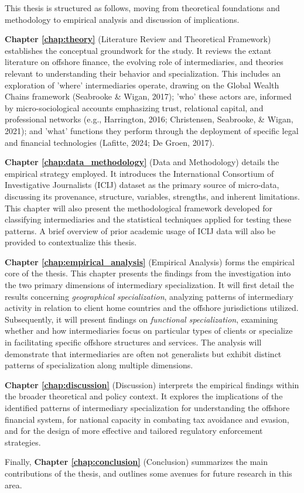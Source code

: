 This thesis is structured as follows, moving from theoretical foundations and methodology to empirical analysis and discussion of implications.

\textbf{Chapter \ref{chap:theory}} (Literature Review and Theoretical Framework) establishes the conceptual groundwork for the study. It reviews the extant literature on offshore finance, the evolving role of intermediaries, and theories relevant to understanding their behavior and specialization. This includes an exploration of 'where' intermediaries operate, drawing on  the Global Wealth Chains framework (Seabrooke \& Wigan, 2017); 'who' these actors are, informed by micro-sociological accounts emphasizing trust, relational capital, and professional networks (e.g., Harrington, 2016; Christensen, Seabrooke, \& Wigan, 2021); and 'what' functions they perform through the deployment of specific legal and financial technologies (Lafitte, 2024; De Groen, 2017).

\textbf{Chapter \ref{chap:data_methodology}} (Data and Methodology) details the empirical strategy employed. It introduces the International Consortium of Investigative Journalists (ICIJ) dataset as the primary source of micro-data, discussing its provenance, structure, variables, strengths, and inherent limitations. This chapter will also present the methodological framework developed for classifying intermediaries and the statistical techniques applied for testing these patterns. A brief overview of prior academic usage of ICIJ data will also be provided to contextualize this thesis.

\textbf{Chapter \ref{chap:empirical_analysis}} (Empirical Analysis) forms the empirical core of the thesis. This chapter presents the findings from the investigation into the two primary dimensions of intermediary specialization. It will first detail the results concerning \textit{geographical specialization}, analyzing patterns of intermediary activity in relation to client home countries and the offshore jurisdictions utilized. Subsequently, it will present findings on \textit{functional specialization}, examining whether and how intermediaries focus on particular types of clients or specialize in facilitating specific offshore structures and services. The analysis will demonstrate that intermediaries are often not generalists but exhibit distinct patterns of specialization along multiple dimensions.

\textbf{Chapter \ref{chap:discussion}} (Discussion) interprets the empirical findings within the broader theoretical and policy context. It explores the implications of the identified patterns of intermediary specialization for understanding the offshore financial system, for national capacity in combating tax avoidance and evasion, and for the design of more effective and tailored regulatory enforcement strategies. 

Finally, \textbf{Chapter \ref{chap:conclusion}} (Conclusion) summarizes the main contributions of the thesis, and outlines some avenues for future research in this area. 

